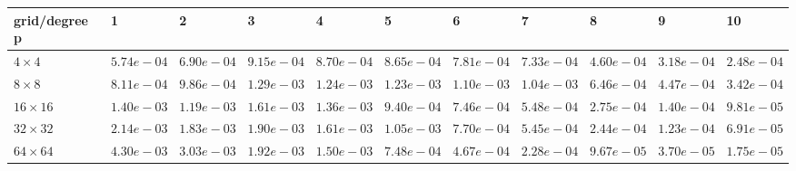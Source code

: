 \begin{tabular}{lllllllllll}
\hline
 grid/degree p   & 1          & 2          & 3          & 4          & 5          & 6          & 7          & 8          & 9          & 10         \\
\hline
 $4 \times 4$    & $5.74e-04$ & $6.90e-04$ & $9.15e-04$ & $8.70e-04$ & $8.65e-04$ & $7.81e-04$ & $7.33e-04$ & $4.60e-04$ & $3.18e-04$ & $2.48e-04$ \\
 $8 \times 8$    & $8.11e-04$ & $9.86e-04$ & $1.29e-03$ & $1.24e-03$ & $1.23e-03$ & $1.10e-03$ & $1.04e-03$ & $6.46e-04$ & $4.47e-04$ & $3.42e-04$ \\
 $16 \times 16$  & $1.40e-03$ & $1.19e-03$ & $1.61e-03$ & $1.36e-03$ & $9.40e-04$ & $7.46e-04$ & $5.48e-04$ & $2.75e-04$ & $1.40e-04$ & $9.81e-05$ \\
 $32 \times 32$  & $2.14e-03$ & $1.83e-03$ & $1.90e-03$ & $1.61e-03$ & $1.05e-03$ & $7.70e-04$ & $5.45e-04$ & $2.44e-04$ & $1.23e-04$ & $6.91e-05$ \\
 $64 \times 64$  & $4.30e-03$ & $3.03e-03$ & $1.92e-03$ & $1.50e-03$ & $7.48e-04$ & $4.67e-04$ & $2.28e-04$ & $9.67e-05$ & $3.70e-05$ & $1.75e-05$ \\
\hline
\end{tabular}